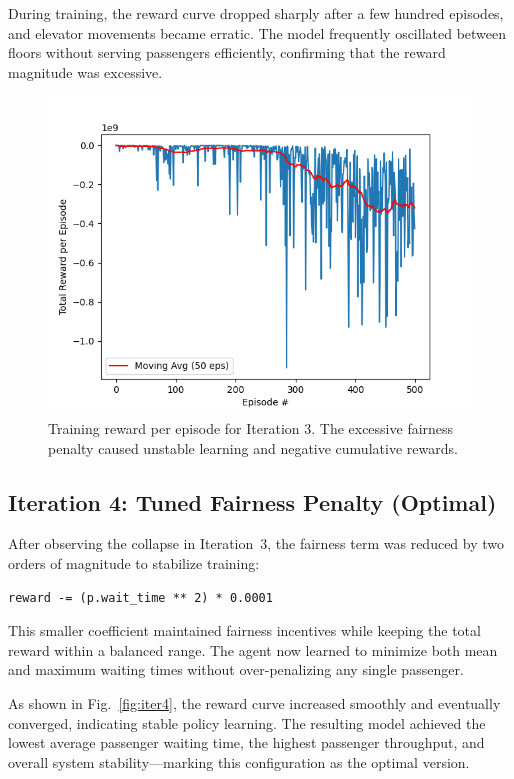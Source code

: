 \documentclass[conference]{IEEEtran}
\begin{document}
During training, the reward curve dropped sharply after a few hundred episodes, and elevator movements became erratic. The model frequently oscillated between floors without serving passengers efficiently, confirming that the reward magnitude was excessive.

\begin{figure}[H]
\centering
\includegraphics[width=\columnwidth]{3_total_reward_per_episode.png}
\caption{Training reward per episode for Iteration 3. The excessive fairness penalty caused unstable learning and negative cumulative rewards.}
\label{fig:iter3}
\end{figure}

\subsection{Iteration 4: Tuned Fairness Penalty (Optimal)}
After observing the collapse in Iteration~3, the fairness term was reduced by two orders of magnitude to stabilize training:
\begin{verbatim}
reward -= (p.wait_time ** 2) * 0.0001
\end{verbatim}
This smaller coefficient maintained fairness incentives while keeping the total reward within a balanced range. The agent now learned to minimize both mean and maximum waiting times without over-penalizing any single passenger.

As shown in Fig.~\ref{fig:iter4}, the reward curve increased smoothly and eventually converged, indicating stable policy learning. The resulting model achieved the lowest average passenger waiting time, the highest passenger throughput, and overall system stability—marking this configuration as the optimal version.
\end{document}
